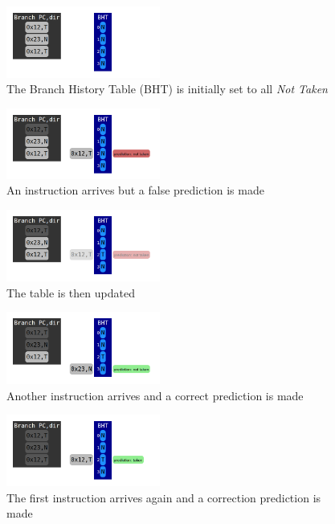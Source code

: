 \documentclass[12pt]{article}
\newenvironment{QandA}{\begin{enumerate}[label=\bfseries\arabic*.]\bfseries}
                      {\end{enumerate}}
\newenvironment{answered}{\par\quad\normalfont}{}
\begin{document}
\begin{QandA}
\begin{answered}
\begin{figure}[!ht]
\centering
\includegraphics[width=0.45\textwidth]{chapter7_imgs/bbp/bbp000.png}
\caption{The Branch History Table (BHT) is initially set to all \textit{Not Taken}}
\label{bbp000}
\end{figure}

\begin{figure}[!ht]
\centering
\includegraphics[width=0.45\textwidth]{chapter7_imgs/bbp/bbp001.png}
\caption{An instruction arrives but a false prediction is made}
\label{bbp001}
\end{figure}

\begin{figure}[!ht]
\centering
\includegraphics[width=0.45\textwidth]{chapter7_imgs/bbp/bbp002.png}
\caption{The table is then updated}
\label{bbp002}
\end{figure}

\begin{figure}[!ht]
\centering
\includegraphics[width=0.45\textwidth]{chapter7_imgs/bbp/bbp003.png}
\caption{Another instruction arrives and a correct prediction is made}
\label{bbp003}
\end{figure}

\begin{figure}[!ht]
\centering
\includegraphics[width=0.45\textwidth]{chapter7_imgs/bbp/bbp004.png}
\caption{The first instruction arrives again and a correction prediction is made}
\label{bbp004}
\end{figure}
\end{answered}


\end{QandA}
\end{document}
